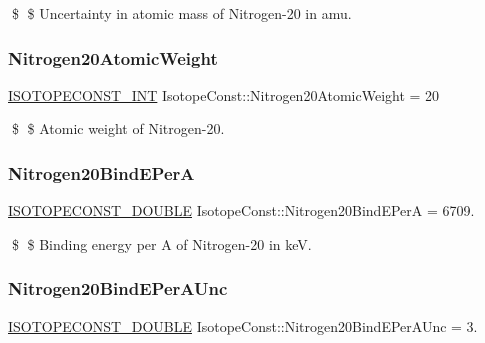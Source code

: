 \$ \$ Uncertainty in atomic mass of Nitrogen-\/20 in amu. \mbox{\label{group___isotope_const-_nitrogen-_n20_ga6809e496dfd0bb38c524583c1b0d2858}} 
\subsubsection{\texorpdfstring{Nitrogen20\+Atomic\+Weight}{Nitrogen20AtomicWeight}}
{\footnotesize\ttfamily \mbox{\hyperlink{group___isotope_const-_macros_ga5f18360b3e99483a35c32d789e62621c}{I\+S\+O\+T\+O\+P\+E\+C\+O\+N\+S\+T\+\_\+\+I\+NT}} Isotope\+Const\+::\+Nitrogen20\+Atomic\+Weight = 20}

\$ \$ Atomic weight of Nitrogen-\/20. \mbox{\label{group___isotope_const-_nitrogen-_n20_ga18ef4c93b32c9fe3d25929cba14f5023}} 
\subsubsection{\texorpdfstring{Nitrogen20\+Bind\+E\+PerA}{Nitrogen20BindEPerA}}
{\footnotesize\ttfamily \mbox{\hyperlink{group___isotope_const-_macros_ga8f45a7272ce02c0b4c65c44636ed719a}{I\+S\+O\+T\+O\+P\+E\+C\+O\+N\+S\+T\+\_\+\+D\+O\+U\+B\+LE}} Isotope\+Const\+::\+Nitrogen20\+Bind\+E\+PerA = 6709.}

\$ \$ Binding energy per A of Nitrogen-\/20 in keV. \mbox{\label{group___isotope_const-_nitrogen-_n20_ga6e19b06cdd577eb5e6f3efd317984a14}} 
\subsubsection{\texorpdfstring{Nitrogen20\+Bind\+E\+Per\+A\+Unc}{Nitrogen20BindEPerAUnc}}
{\footnotesize\ttfamily \mbox{\hyperlink{group___isotope_const-_macros_ga8f45a7272ce02c0b4c65c44636ed719a}{I\+S\+O\+T\+O\+P\+E\+C\+O\+N\+S\+T\+\_\+\+D\+O\+U\+B\+LE}} Isotope\+Const\+::\+Nitrogen20\+Bind\+E\+Per\+A\+Unc = 3.}

